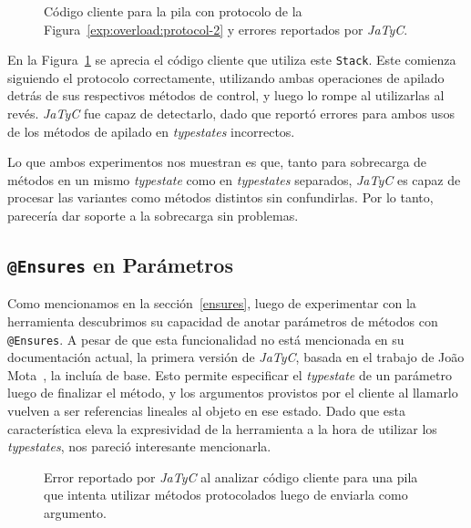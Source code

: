 \begin{figure}[htbp]
    \centering
    
    \vspace{0.3cm}
    
    \caption{Código cliente para la pila con protocolo de la Figura~\ref{exp:overload:protocol-2} y errores reportados por \textit{JaTyC}.}
    \label{exp:overloaded:error}
\end{figure}

En la Figura~\ref{exp:overloaded:error} se aprecia el código cliente que utiliza este \texttt{Stack}. Este comienza siguiendo el protocolo correctamente, utilizando ambas operaciones de apilado detrás de sus respectivos métodos de control, y luego lo rompe al utilizarlas al revés. \textit{JaTyC} fue capaz de detectarlo, dado que reportó errores para ambos usos de los métodos de apilado en \textit{typestates} incorrectos.

Lo que ambos experimentos nos muestran es que, tanto para sobrecarga de métodos en un mismo \textit{typestate} como en \textit{typestates} separados, \textit{JaTyC} es capaz de procesar las variantes como métodos distintos sin confundirlas. Por lo tanto, parecería dar soporte a la sobrecarga sin problemas.

\subsection{\texttt{@Ensures} en Parámetros}
\label{exp:ensures}

Como mencionamos en la sección~\ref{ensures}, luego de experimentar con la herramienta descubrimos su capacidad de anotar parámetros de métodos con \texttt{@Ensures}. A pesar de que esta funcionalidad no está mencionada en su documentación actual, la primera versión de \textit{JaTyC}, basada en el trabajo de João Mota~\cite{jatyc:msc-thesis}, la incluía de base. Esto permite especificar el \textit{typestate} de un parámetro luego de finalizar el método, y los argumentos provistos por el cliente al llamarlo vuelven a ser referencias lineales al objeto en ese estado. Dado que esta característica eleva la expresividad de la herramienta a la hora de utilizar los \textit{typestates}, nos pareció interesante mencionarla.

\begin{figure}[htbp]
    \centering
    
    \vspace{0.3cm}
    
    \caption{Error reportado por \textit{JaTyC} al analizar código cliente para una pila que intenta utilizar métodos protocolados luego de enviarla como argumento.}
    \label{exp:parameter-ensures-1}
\end{figure}

